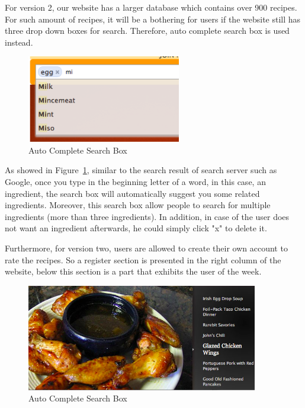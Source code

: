 For version 2, our website has a larger database which contains over 900 recipes. For such amount of recipes, it will be a bothering for users if the website still has three drop down boxes for search. Therefore, auto complete search box is used instead. 

\begin{figure}[h]
\begin{center}
\includegraphics[width=0.6\textwidth]{auto_complete}
\caption{Auto Complete Search Box}
\label{fig:auto_complete}
\end{center}
\end{figure}

As showed in Figure~\ref{fig:auto_complete}, similar to the search result of search server such as Google, once you type in the beginning letter of a word, in this case, an ingredient, the search box will automatically suggest you some related ingredients. Moreover, this search box allow people to search for multiple ingredients (more than three ingredients). In addition, in case of the user does not want an ingredient afterwards, he could simply click "x" to delete it.

Furthermore, for version two, users are allowed to create their own account to rate the recipes. So a register section is presented in the right column of the website, below this section is a part that exhibits the user of the week. 

\begin{figure}[H]
\begin{center}
\includegraphics[width=0.9\textwidth]{slideshow}
\caption{Auto Complete Search Box}
\label{fig:slideshow}
\end{center}
\end{figure}

